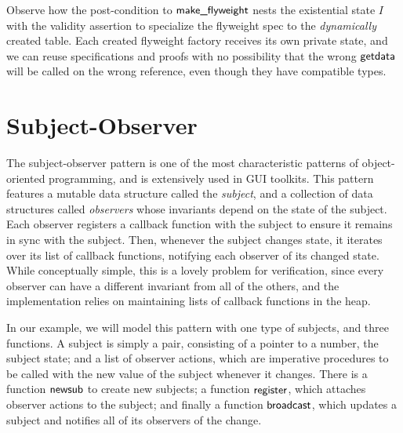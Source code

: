 \documentclass[preprint,natbib]{sigplanconf}
\begin{document}
Observe how the post-condition to $\mbox{\textsf{{make\_flyweight}}}$ nests the
existential state $I$ with the validity assertion to specialize the
flyweight spec to the \emph{dynamically} created table. Each created
flyweight factory receives its own private state, and we can reuse
specifications and proofs with no possibility that the wrong
$\mbox{\textsf{{getdata}}}$ will be called on the wrong reference, even though
they have compatible types.



\section{Subject-Observer}

The subject-observer pattern is one of the most characteristic
patterns of object-oriented programming, and is extensively used in
GUI toolkits. This pattern features a mutable data structure called
the \emph{subject}, and a collection of data structures called
\emph{observers} whose invariants depend on the state of the
subject. Each observer registers a callback function with the subject
to ensure it remains in sync with the subject. Then, whenever the
subject changes state, it iterates over its list of callback
functions, notifying each observer of its changed state. While
conceptually simple, this is a lovely problem for verification, since
every observer can have a different invariant from all of the others,
and the implementation relies on maintaining lists of callback
functions in the heap.  

In our example, we will model this pattern with one type of subjects,
and three functions. A subject is simply a pair, consisting of a
pointer to a number, the subject state; and a list of observer
actions, which are imperative procedures to be called with the new
value of the subject whenever it changes. There is a function
$\mbox{\textsf{{newsub}}}$ to create new subjects; a function
$\mbox{\textsf{{register}}}$, which attaches observer actions to the subject;
and finally a function $\mbox{\textsf{{broadcast}}}$, which updates a subject
and notifies all of its observers of the change. 
\end{document}
